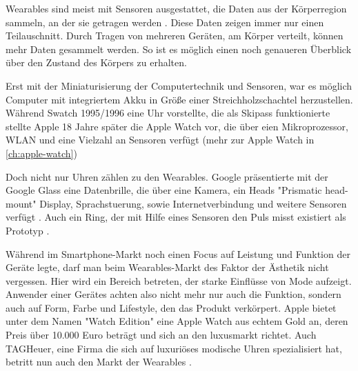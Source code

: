 Wearables sind meist mit Sensoren ausgestattet, die Daten aus der Körperregion sammeln, an der sie getragen werden \cite{4711366}. Diese Daten zeigen immer nur einen Teilauschnitt. Durch Tragen von mehreren Geräten, am Körper verteilt, können mehr Daten gesammelt werden. So ist es möglich einen noch genaueren Überblick über den Zustand des Körpers zu erhalten\cite{4711366}.

Erst mit der Miniaturisierung der Computertechnik und Sensoren, war es möglich Computer mit integriertem Akku in Größe einer Streichholzschachtel herzustellen. Während Swatch 1995/1996 eine Uhr vorstellte, die als Skipass funktionierte stellte Apple 18 Jahre später die Apple Watch vor, die über eien Mikroprozessor, WLAN und eine Vielzahl an Sensoren verfügt (mehr zur Apple Watch in \ref{ch:apple-watch})

Doch nicht nur Uhren zählen zu den Wearables. Google präsentierte mit der Google Glass eine Datenbrille, die über eine Kamera, ein Heads "Prismatic head-mount" Display, Sprachstuerung, sowie Internetverbindung und weitere Sensoren verfügt \cite{Muensterer2014281}. Auch ein Ring, der mit Hilfe eines Sensoren den Puls misst existiert als Prototyp \cite{4711366}.

Während im Smartphone-Markt noch einen Focus auf Leistung und Funktion der Geräte legte, darf man beim Wearables-Markt des Faktor der Ästhetik nicht vergessen. Hier wird ein Bereich betreten, der starke Einflüsse von Mode aufzeigt. Anwender einer Gerätes achten also nicht mehr nur auch die Funktion, sondern auch auf Form, Farbe und Lifestyle, den das Produkt verkörpert. Apple bietet unter dem Namen "Watch Edition" eine Apple Watch aus echtem Gold an, deren Preis über 10.000 Euro beträgt und sich an den luxusmarkt richtet. Auch TAGHeuer, eine Firma die sich auf luxuriöses modische Uhren spezialisiert hat, betritt nun auch den Markt der Wearables \cite{TAGHeuer:20015aa}.